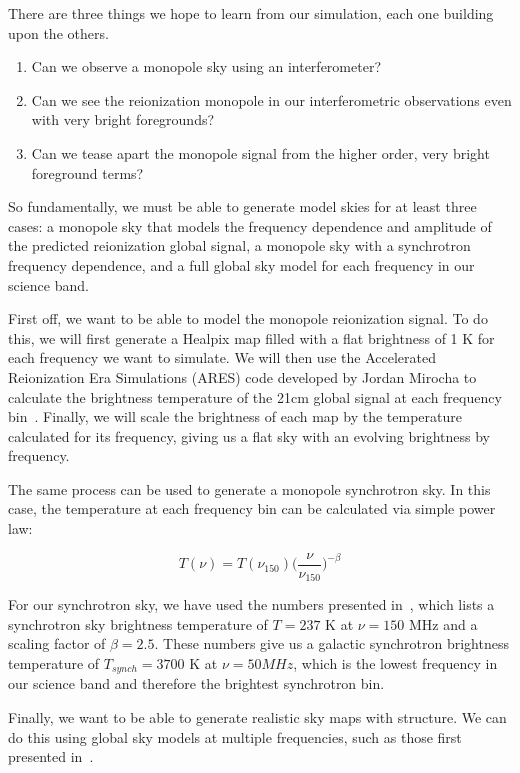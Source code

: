 There are three things we hope to learn from our simulation, each one building 
upon the others.
\begin{enumerate}
 \item Can we observe a monopole sky using an interferometer?
 \item Can we see the reionization monopole in our interferometric observations 
  even with very bright foregrounds?
 \item Can we tease apart the monopole signal from the higher order, very 
  bright foreground terms?
\end{enumerate}

So fundamentally, we must be able to generate model skies for at least three 
cases: a monopole sky that models the frequency dependence and amplitude of the 
predicted reionization global signal, a monopole sky with a synchrotron 
frequency dependence, and a full global sky model for each frequency in our 
science band.

First off, we want to be able to model the monopole reionization signal. To do 
this, we will first generate a Healpix map filled with a flat brightness of 1 K 
for each frequency we want to simulate. We will then use the Accelerated 
Reionization Era Simulations (ARES) code developed by Jordan Mirocha to 
calculate the brightness temperature of the 21cm global signal at each 
frequency bin~\citep{mirocha2014}. Finally, we will scale the brightness of 
each map by the temperature calculated for its frequency, giving us a flat sky 
with an evolving brightness by frequency.

The same process can be used to generate a monopole synchrotron sky. In this 
case, the temperature at each frequency bin can be calculated via simple power 
law:

\begin{equation}
    \label{eq:synch-temp}
    T(\nu) = T(\nu_{150}) \Big(\frac{\nu}{\nu_{150}} \Big)^{-\beta}
\end{equation}

For our synchrotron sky, we have used the numbers presented 
in~\cite{rogers2008}, which lists a synchrotron sky brightness temperature of 
$T = 237$ K at $\nu = 150$ MHz and a scaling factor of $\beta = 2.5$. These 
numbers give us a galactic synchrotron brightness temperature of $T_{synch} = 
3700$ K at $\nu = 50 MHz$, which is the lowest frequency in our science band 
and therefore the brightest synchrotron bin. 

Finally, we want to be able to generate realistic sky maps with structure. We 
can do this using global sky models at multiple frequencies, such as those 
first presented in~\cite{haslam1982}.
